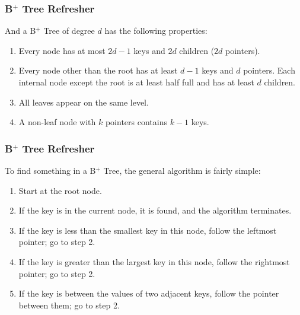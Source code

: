 \begin{frame}
\frametitle{B$^{+}$ Tree Refresher}

And a B$^{+}$ Tree of degree $d$ has the following properties:

\begin{enumerate}
	\item Every node has at most $2d-1$ keys and $2d$ children ($2d$ pointers).
	\item Every node other than the root has at least $d-1$ keys and $d$ pointers. Each internal node except the root is at least half full and has at least $d$ children.
	\item All leaves appear on the same level.
	\item A non-leaf node with $k$ pointers contains $k-1$ keys.
\end{enumerate}


\end{frame}


\begin{frame}
\frametitle{B$^{+}$ Tree Refresher}


To find something in a B$^{+}$ Tree, the general algorithm is fairly simple:

\begin{enumerate}
	\item Start at the root node. 
	\item If the key is in the current node, it is found, and the algorithm terminates.
	\item If the key is less than the smallest key in this node, follow the leftmost pointer; go to step 2.
	\item If the key is greater than the largest key in this node, follow the rightmost pointer; go to step 2.
	\item If the key is between the values of two adjacent keys, follow the pointer between them; go to step 2.
\end{enumerate}


\end{frame}

